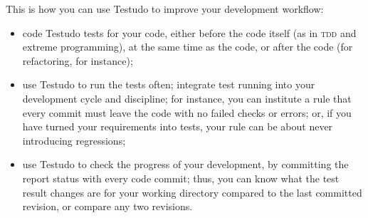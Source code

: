 \documentclass[twoside, a4paper, article]{memoir}
\begin{document}
This is how you can use Testudo to improve your development workflow:
\begin{itemize}
\item code Testudo tests for your code, either before the code itself (as in
  \textsc{tdd} and extreme programming), at the same time as the code, or after
  the code (for refactoring, for instance);
\item use Testudo to run the tests often; integrate test running into your
  development cycle and discipline; for instance, you can institute a rule that
  every commit must leave the code with no failed checks or errors; or, if you
  have turned your requirements into tests, your rule can be about never
  introducing regressions;
\item use Testudo to check the progress of your development, by committing the
  report status with every code commit; thus, you can know what the test result
  changes are for your working directory compared to the last committed
  revision, or compare any two revisions.
\end{itemize}
\end{document}
